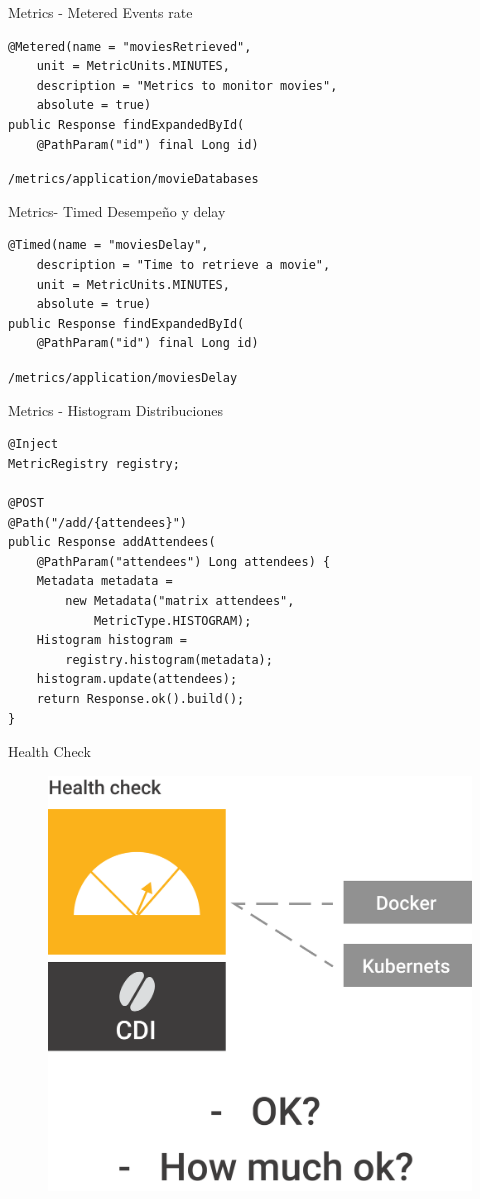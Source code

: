 \documentclass{beamer}
\begin{document}
\begin{frame}[fragile]{Metrics - Metered}
Events rate
\begin{lstlisting}
@Metered(name = "moviesRetrieved",
	unit = MetricUnits.MINUTES,
	description = "Metrics to monitor movies",
	absolute = true)
public Response findExpandedById(
	@PathParam("id") final Long id) 
\end{lstlisting}

\lstinline|/metrics/application/movieDatabases|
\end{frame}

\begin{frame}[fragile]{Metrics- Timed}
Desempeño y delay
\begin{lstlisting}
@Timed(name = "moviesDelay",
	description = "Time to retrieve a movie",
	unit = MetricUnits.MINUTES,
	absolute = true)
public Response findExpandedById(
	@PathParam("id") final Long id) 
\end{lstlisting}

\lstinline|/metrics/application/moviesDelay|
\end{frame}

\begin{frame}[fragile]{Metrics - Histogram}
Distribuciones
\begin{lstlisting}
@Inject
MetricRegistry registry;

@POST
@Path("/add/{attendees}")
public Response addAttendees(
	@PathParam("attendees") Long attendees) {
	Metadata metadata =
		new Metadata("matrix attendees",
			MetricType.HISTOGRAM);
	Histogram histogram = 
		registry.histogram(metadata);
	histogram.update(attendees);
	return Response.ok().build();
}
\end{lstlisting}

\end{frame}

\begin{frame}{Health Check}
\begin{figure}
	\centering
	\includegraphics[width=0.75\linewidth]{Images/healthcheck}
\end{figure}
\end{frame}
\end{document}

